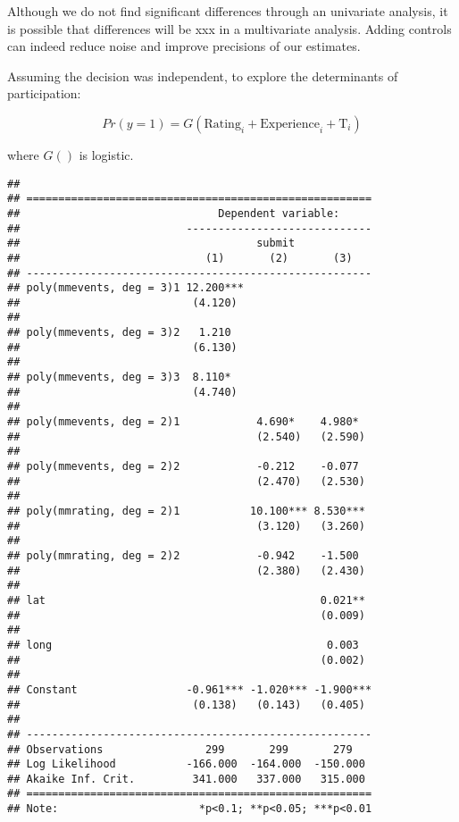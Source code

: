 \documentclass[12pt,]{article}
\begin{document}
Although we do not find significant differences through an univariate
analysis, it is possible that differences will be xxx in a multivariate
analysis. Adding controls can indeed reduce noise and improve precisions
of our estimates.

Assuming the decision was independent, to explore the determinants of
participation:

\begin{equation}
  Pr(y=1) = G(\text{Rating}_{i} + \text{Experience}_{i} + \text{T}_{i})
\end{equation}

where \(G()\) is logistic.

\begin{verbatim}
## 
## ======================================================
##                               Dependent variable:     
##                          -----------------------------
##                                     submit            
##                             (1)       (2)       (3)   
## ------------------------------------------------------
## poly(mmevents, deg = 3)1 12.200***                    
##                           (4.120)                     
##                                                       
## poly(mmevents, deg = 3)2   1.210                      
##                           (6.130)                     
##                                                       
## poly(mmevents, deg = 3)3  8.110*                      
##                           (4.740)                     
##                                                       
## poly(mmevents, deg = 2)1            4.690*    4.980*  
##                                     (2.540)   (2.590) 
##                                                       
## poly(mmevents, deg = 2)2            -0.212    -0.077  
##                                     (2.470)   (2.530) 
##                                                       
## poly(mmrating, deg = 2)1           10.100*** 8.530*** 
##                                     (3.120)   (3.260) 
##                                                       
## poly(mmrating, deg = 2)2            -0.942    -1.500  
##                                     (2.380)   (2.430) 
##                                                       
## lat                                           0.021** 
##                                               (0.009) 
##                                                       
## long                                           0.003  
##                                               (0.002) 
##                                                       
## Constant                 -0.961*** -1.020*** -1.900***
##                           (0.138)   (0.143)   (0.405) 
##                                                       
## ------------------------------------------------------
## Observations                299       299       279   
## Log Likelihood           -166.000  -164.000  -150.000 
## Akaike Inf. Crit.         341.000   337.000   315.000 
## ======================================================
## Note:                      *p<0.1; **p<0.05; ***p<0.01
\end{verbatim}
\end{document}
